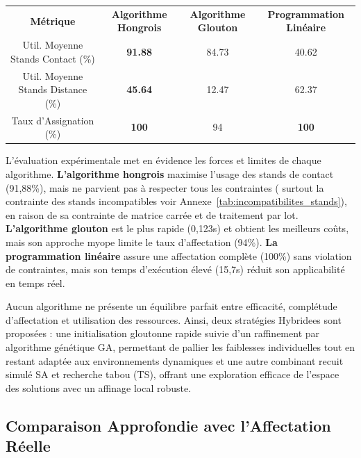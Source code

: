 \begin{table}[htbp]
{\begin{tabular}{|c|c|c|c|c|c|c|c|c|c|c|}
			\hline
			\multicolumn{2}{|c|}{\textbf{Métrique}} & \multicolumn{3}{c|}{\textbf{Algorithme Hongrois}} & \multicolumn{3}{c|}{\textbf{Algorithme Glouton}} & \multicolumn{3}{c|}{\textbf{Programmation Linéaire}} \\
			\cline{3-11}
			\multicolumn{2}{|c|}{Util. Moyenne Stands Contact (\%)} & \multicolumn{3}{c|}{\textbf{91.88}} & \multicolumn{3}{c|}{84.73} & \multicolumn{3}{c|}{40.62} \\
			\multicolumn{2}{|c|}{Util. Moyenne Stands Distance (\%)} & \multicolumn{3}{c|}{\textbf{45.64}} & \multicolumn{3}{c|}{12.47} & \multicolumn{3}{c|}{62.37} \\
			\multicolumn{2}{|c|}{Taux d’Assignation (\%)} & \multicolumn{3}{c|}{\textbf{100}} & \multicolumn{3}{c|}{94} & \multicolumn{3}{c|}{\textbf{100}} \\
			\hline
		\end{tabular}
	}
\end{table}


L’évaluation expérimentale met en évidence les forces et limites de chaque algorithme. \textbf{L’algorithme hongrois} maximise l’usage des stands de contact (91{,}88\%), mais ne parvient pas à respecter tous les contraintes ( surtout la contrainte des stands incompatibles voir Annexe~\ref{tab:incompatibilites_stands}), en raison de sa contrainte de matrice carrée et de traitement par lot. \textbf{L’algorithme glouton} est le plus rapide (0{,}123s) et obtient les meilleurs coûts, mais son approche myope limite le taux d’affectation (94\%). \textbf{La programmation linéaire} assure une affectation complète (100\%) sans violation de contraintes, mais son temps d’exécution élevé (15{,}7s) réduit son applicabilité en temps réel.

Aucun algorithme ne présente un équilibre parfait entre efficacité, complétude d’affectation et utilisation des ressources. Ainsi, deux stratégies Hybridees sont proposées : une initialisation gloutonne rapide suivie d’un raffinement par algorithme génétique \ac{GA}, permettant de pallier les faiblesses individuelles tout en restant adaptée aux environnements dynamiques  et une autre combinant recuit simulé \ac{SA} et recherche tabou (TS), offrant une exploration efficace de l’espace des solutions avec un affinage local robuste.
\vspace{-1.7em}
\subsection{Comparaison Approfondie avec l’Affectation Réelle}

